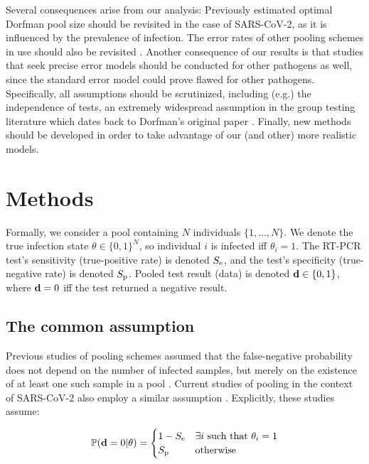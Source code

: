 \documentclass{article}
\begin{document}
Several consequences arise from our analysis: Previously estimated
optimal Dorfman pool size \cite{OptimalDorfmanPool} should be
revisited in the case of SARS-CoV-2, as it is influenced by the
prevalence of infection. The error rates of other pooling schemes in
use should also be revisited \cite{BayesianDorfman, Kim}. Another
consequence of our results is that studies that seek precise error
models should be conducted for other pathogens as well, since the
standard error model could prove flawed for other
pathogens. Specifically, all assumptions should be scrutinized,
including (e.g.) the independence of tests, an extremely widespread
assumption in the group testing literature \cite{Kim,
  OptimalDorfmanPool} which dates back to Dorfman's original paper
\cite{DorfmanOriginal}. Finally, new methods should be developed in
order to take advantage of our (and other) more realistic models.

\section*{Methods}
Formally, we consider a pool containing $N$ individuals
$\{1,\dots,N\}$. We denote the true infection state $\theta \in
\{0,1\}^N$, so individual $i$ is infected iff $\theta_i=1$. The RT-PCR
test's sensitivity (true-positive rate) is denoted $S_{\text{e}}$, and the
test's specificity (true-negative rate) is denoted $S_{\text{p}}$. Pooled
test result (data) is denoted $\mathbf{d} \in \{0,1\}$, where $\mathbf{d}=0$ iff
the test returned a negative result.

\subsection*{The common assumption}\label{subsec:common}
Previous studies of pooling schemes assumed that the false-negative
probability does not depend on the number of infected samples, but
merely on the existence of at least one such sample in a pool
\cite{Kim, OptimalDorfmanPool}. Current studies of pooling in the
context of SARS-CoV-2 also employ a similar assumption
\cite{Simplistic1, Simplistic2}. Explicitly, these studies assume:

\begin{align}\label{eq:common}
  \mathbb{P}(\mathbf{d}=0|\theta) = 
  \begin{cases} 
    1-S_{\text{e}} & \exists i\ \text{such that } \theta_i = 1\\
    S_{\text{p}} & \text{otherwise}
  \end{cases} 
\end{align}
\end{document}
